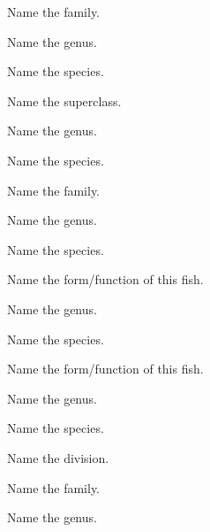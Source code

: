 \documentclass{exam}
\begin{document}
\begin{questions}

{\Large%

\question
Name the family.
\vspace{0.5\baselineskip}

\question
Name the genus.
\vspace{0.5\baselineskip}

\question 
Name the species.
\vspace{2\baselineskip}

\question 
Name the superclass.
\vspace{0.5\baselineskip}

\question 
Name the genus.
\vspace{0.5\baselineskip}

\question 
Name the species.
\vspace{2\baselineskip}


\question 
Name the family.
\vspace{0.5\baselineskip}

\question 
Name the genus.
\vspace{0.5\baselineskip}

\question 
Name the species.
\vspace{0.5\baselineskip}

\question 
Name the form/function of this fish.
\vspace{2\baselineskip}

\question 
Name the genus. 
\vspace{0.5\baselineskip}

\question 
Name the species.
\vspace{0.5\baselineskip}

\question 
Name the form/function of this fish.
\vspace{2\baselineskip}

\question 
Name the genus.
\vspace{0.5\baselineskip}

\question 
Name the species.
\vspace{2\baselineskip}

\newpage

\question 
Name the division.
\vspace{0.5\baselineskip}

\question 
Name the family.
\vspace{0.5\baselineskip}

\question 
Name the genus.
\vspace{0.5\baselineskip}

}
\end{questions}
\end{document}
